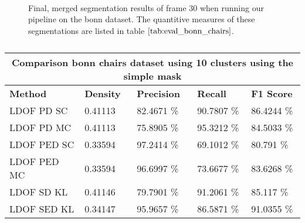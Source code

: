 \begin{figure}[H]
\begin{center}
~
~
\end{center}
\caption[Simple Merged Segments Bonn Chairs]{Final, merged segmentation results of frame 30 when running our pipeline on the bonn dataset. The quantitive measures of these segmentations are listed in table $\ref{tab:eval_bonn_chairs}$.}
\label{fig:eval_bonn_chairs_c_10_simple}
\end{figure}

\begin{table}[H]
\centering
\begin{tabular}{|l|l|l|l|l|}
\hline
\multicolumn{5}{|c|}{Comparison bonn chairs dataset using 10 clusters using the simple mask}                        \\ \hline
\textbf{Method} & \textbf{Density} & \textbf{Precision} & \textbf{Recall} & \textbf{F1 Score} \\ \hline
LDOF PD SC & 0.41113 & 82.4671 \%   & 90.7807 \%     & 86.4244 \% \\ \hline
LDOF PD MC & 0.41113 & 75.8905 \%   & 95.3212 \%     & 84.5033 \%  \\ \hline
LDOF PED SC & 0.33594 & 97.2414 \%   & 69.1012 \%     & 80.791 \%  \\ \hline
LDOF PED MC & 0.33594 & 96.6997 \%   & 73.6677 \%     & 83.6268 \%  \\ \hline              
LDOF SD KL & 0.41146 & 79.7901 \%   & 91.2061 \%     & 85.117 \%    \\ \hline
LDOF SED KL & 0.34147 & 95.9657 \%   & 86.5871 \%     & 91.0355 \%  \\ \hline
\end{tabular}
\caption[Bonn Chairs Merged 10 Clusters]{}
\label{tab:eval_bonn_chairs_c_10_simple}
\end{table}



